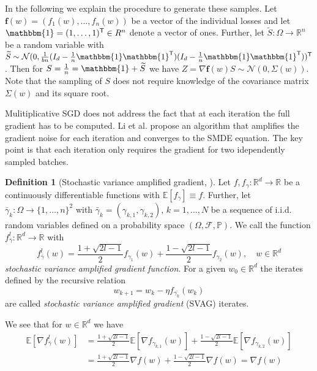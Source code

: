 \documentclass[12pt]{article}
\theoremstyle{definition}
\newtheorem{definition}[definition]{Definition}
\numberwithin{equation}{section}
\newcommand{\R}{\mathbb{R}}
\newcommand{\BP}{\mathbb{P}}
\newcommand{\CF}{\mathcal{F}}
\newcommand{\CN}{\mathcal{N}}
\newcommand{\T}{\mathsf{T}}
\newcommand{\ev}[1]{\mathbb{E}\left[{#1}\right]}
\begin{document}
In the following we explain the procedure to generate these samples.
Let $\pmb{f}(w) = (f_1(w), \dots, f_n(w))$ be a vector of the individual losses and let $\mathbbm{1} = (1, \dots, 1)^\T \in R^n$ denote a vector of ones. Further, let $\widetilde{S} : \Omega \rightarrow \R^n$ be a random variable  with $\widetilde{S} \sim \CN(0, \frac{1}{bn}(I_d - \frac{1}{n}\mathbbm{1}\mathbbm{1}^\T )(I_d - \frac{1}{n}\mathbbm{1}\mathbbm{1}^\T))^\T$. Then for $S = \frac{1}{n} = \mathbbm{1} + \widetilde{S}$ we have $Z = \nabla \pmb{f}(w)S \sim \CN(0, \Sigma(w))$.
Note that the sampling of $S$ does not require knowledge of the covariance matrix $\Sigma(w)$ and its square root.

Mulitiplicative SGD does not address the fact that at each iteration the full gradient has to be computed. Li et al. \cite{liValidityModelingSGD2021} propose an algorithm that amplifies the gradient noise for each iteration and converges to the SMDE equation. The key point is that each iteration only requires the gradient for two idependently sampled batches. 
\begin{definition}[Stochastic variance amplified gradient, \cite{liValidityModelingSGD2021}]
  Let $f, f_{\gamma} : \R^d \rightarrow \R$ be a continuously differentiable functions with $\ev{f_{\gamma}} \equiv f$. Further, let $\bar{\gamma}_k : \Omega \rightarrow \{1,\dots,n\}^2 $ with $\bar{\gamma}_k =(\gamma_{k,1}, \gamma_{k,2})$, $k=1,\dots,N$ be a sequence of i.i.d. random variables defined on a probability space $(\Omega, \CF, \BP)$. We call the function $f^l_{\bar{\gamma}} : \R^d \rightarrow \R$ with
  \begin{equation*}
    f^l_{\bar{\gamma}}(w) =  \frac{1+\sqrt{2l - 1}}{2}f_{\gamma_{1}}(w) + \frac{1-\sqrt{2l - 1}}{2}f_{\gamma_{2}}(w), \quad w \in \R^d
  \end{equation*}
  \emph{stochastic variance amplified gradient function}.
    For a given $w_{0} \in \R^d$ the iterates defined by the recursive relation
  \begin{equation*}
    w_{k+1} = w_{k} - \eta f_{\bar{\gamma_k}}(w_{k})
  \end{equation*}
  are called \emph{stochastic variance amplified gradient} (SVAG) iterates.
\end{definition}
We see that for $w \in \R^d$ we have
\begin{align*}
  \ev{\nabla f^l_{\bar{\gamma}}(w)} &= \frac{1+\sqrt{2l - 1}}{2}\ev{\nabla f_{\gamma_{k,1}}(w)} + \frac{1-\sqrt{2l - 1}}{2}\ev{\nabla f_{\gamma_{k,2}}(w)} \\
  &= \frac{1+\sqrt{2l - 1}}{2}\nabla f(w) + \frac{1-\sqrt{2l - 1}}{2} \nabla f(w) = \nabla f(w)
\end{align*}
\end{document}
